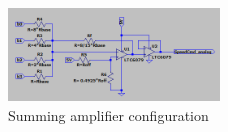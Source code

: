 \begin{figure}[H]
\centering
\includegraphics[width=0.5\textwidth]{./Figures/DAC_sim_cir.png}
\caption{Summing amplifier configuration}
\label{fig:DAC_sim_sumAmp}
\end{figure}







